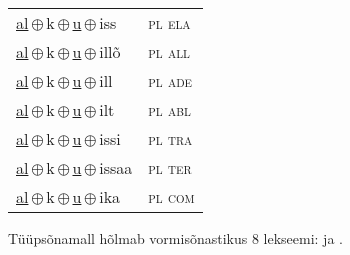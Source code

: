 \begin{minipage}{\textwidth}
\begin{sideways}
\begin{tabular}{l l}
\underline{al}\,$\oplus$\,k\,$\oplus$\,\underline{u}\,$\oplus$\,iss & \textsc{ pl ela } \\
\underline{al}\,$\oplus$\,k\,$\oplus$\,\underline{u}\,$\oplus$\,illõ & \textsc{ pl all } \\
\underline{al}\,$\oplus$\,k\,$\oplus$\,\underline{u}\,$\oplus$\,ill & \textsc{ pl ade } \\
\underline{al}\,$\oplus$\,k\,$\oplus$\,\underline{u}\,$\oplus$\,ilt & \textsc{ pl abl } \\
\underline{al}\,$\oplus$\,k\,$\oplus$\,\underline{u}\,$\oplus$\,issi & \textsc{ pl tra } \\
\underline{al}\,$\oplus$\,k\,$\oplus$\,\underline{u}\,$\oplus$\,issaa & \textsc{ pl ter } \\
\underline{al}\,$\oplus$\,k\,$\oplus$\,\underline{u}\,$\oplus$\,ika & \textsc{ pl com } \\
\end{tabular}
\end{sideways}
\label{tab:tüüpsõnamall-alku}

\end{minipage}

 
\vspace{1em}
\noindent Tüüpsõnamall  hõlmab vormisõnastikus 8 lekseemi:  ja .
